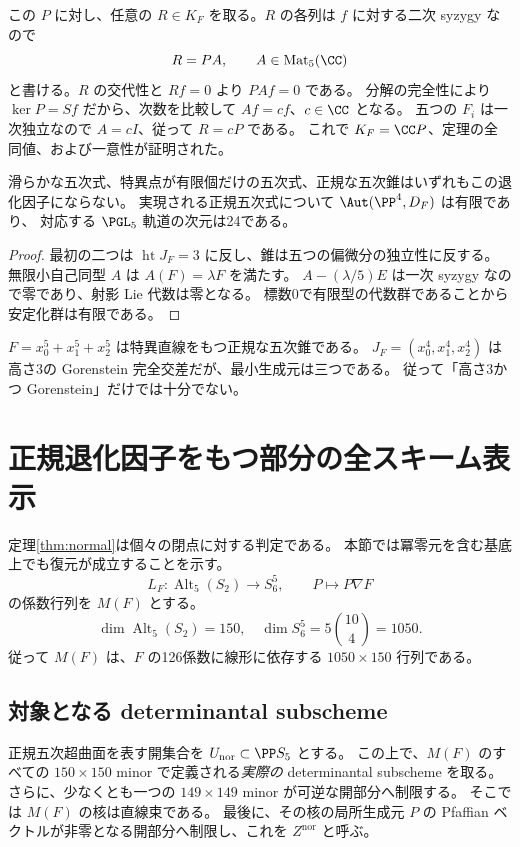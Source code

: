 この $P$ に対し、任意の $R\in K_F$ を取る。$R$ の各列は $f$ に対する二次 syzygy なので
\[
                          R=PA,\qquad A\in\operatorname{Mat}_5(\CC)
\]
と書ける。$R$ の交代性と $Rf=0$ より $PAf=0$ である。
分解の完全性により $\ker P=Sf$ だから、次数を比較して $Af=cf$、$c\in\CC$ となる。
五つの $F_i$ は一次独立なので $A=cI$、従って $R=cP$ である。
これで $K_F=\CC P$、定理の全同値、および一意性が証明された。

\begin{corollary}[存在しない正規五次式と有限安定化群]
滑らかな五次式、特異点が有限個だけの五次式、正規な五次錐はいずれもこの退化因子にならない。
実現される正規五次式について $\Aut(\PP^4,D_F)$ は有限であり、
対応する $\PGL_5$ 軌道の次元は24である。
\end{corollary}
\begin{proof}
最初の二つは $\operatorname{ht}J_F=3$ に反し、錐は五つの偏微分の独立性に反する。
無限小自己同型 $A$ は $A(F)=\lambda F$ を満たす。
$A-(\lambda/5)E$ は一次 syzygy なので零であり、射影 Lie 代数は零となる。
標数0で有限型の代数群であることから安定化群は有限である。
\end{proof}

\begin{remark}[五生成元という仮定を落とせない]
$F=x_0^5+x_1^5+x_2^5$ は特異直線をもつ正規な五次錐である。
$J_F=(x_0^4,x_1^4,x_2^4)$ は高さ3の Gorenstein 完全交差だが、最小生成元は三つである。
従って「高さ3かつ Gorenstein」だけでは十分でない。
\end{remark}

\section{正規退化因子をもつ部分の全スキーム表示}
\label{sec:normal-scheme}

定理\ref{thm:normal}は個々の閉点に対する判定である。
本節では冪零元を含む基底上でも復元が成立することを示す。
\[
 L_F:\operatorname{Alt}_5(S_2)\longrightarrow S_6^5,
 \qquad P\longmapsto P\nabla F
\]
の係数行列を $M(F)$ とする。
\[
        \dim\operatorname{Alt}_5(S_2)=150,
        \quad \dim S_6^5=5\binom{10}{4}=1050.
\]
従って $M(F)$ は、$F$ の126係数に線形に依存する $1050\times150$ 行列である。

\subsection{対象となる determinantal subscheme}

正規五次超曲面を表す開集合を $U_{\mathrm{nor}}\subset\PP S_5$ とする。
この上で、$M(F)$ のすべての $150\times150$ minor で定義される\emph{実際の} determinantal subscheme を取る。
さらに、少なくとも一つの $149\times149$ minor が可逆な開部分へ制限する。
そこでは $M(F)$ の核は直線束である。
最後に、その核の局所生成元 $P$ の Pfaffian ベクトルが非零となる開部分へ制限し、これを $Z^{\mathrm{nor}}$ と呼ぶ。

